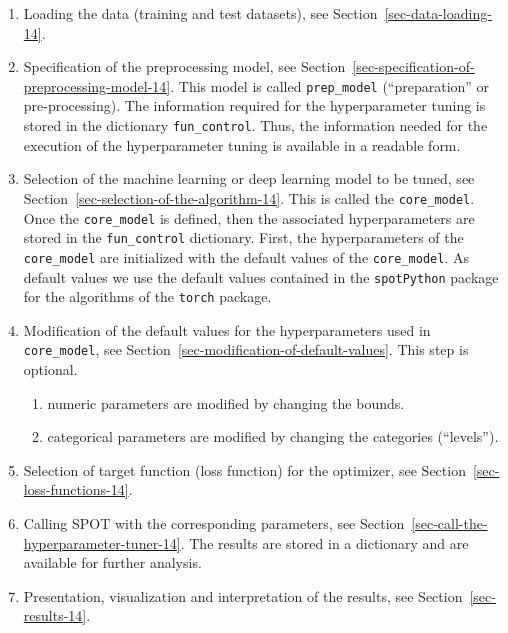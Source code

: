 \documentclass[
  letterpaper,
  DIV=11,
  numbers=noendperiod]{scrreprt}
\providecommand{\tightlist}{%
  \setlength{\itemsep}{0pt}\setlength{\parskip}{0pt}}\usepackage{longtable,booktabs,array}
\begin{document}
\begin{enumerate}
\def\labelenumi{\arabic{enumi}.}
\tightlist
\item
  Loading the data (training and test datasets), see
  Section~\ref{sec-data-loading-14}.
\item
  Specification of the preprocessing model, see
  Section~\ref{sec-specification-of-preprocessing-model-14}. This model
  is called \texttt{prep\_model} (``preparation'' or pre-processing).
  The information required for the hyperparameter tuning is stored in
  the dictionary \texttt{fun\_control}. Thus, the information needed for
  the execution of the hyperparameter tuning is available in a readable
  form.
\item
  Selection of the machine learning or deep learning model to be tuned,
  see Section~\ref{sec-selection-of-the-algorithm-14}. This is called
  the \texttt{core\_model}. Once the \texttt{core\_model} is defined,
  then the associated hyperparameters are stored in the
  \texttt{fun\_control} dictionary. First, the hyperparameters of the
  \texttt{core\_model} are initialized with the default values of the
  \texttt{core\_model}. As default values we use the default values
  contained in the \texttt{spotPython} package for the algorithms of the
  \texttt{torch} package.
\item
  Modification of the default values for the hyperparameters used in
  \texttt{core\_model}, see
  Section~\ref{sec-modification-of-default-values}. This step is
  optional.

  \begin{enumerate}
  \def\labelenumii{\arabic{enumii}.}
  \tightlist
  \item
    numeric parameters are modified by changing the bounds.
  \item
    categorical parameters are modified by changing the categories
    (``levels'').
  \end{enumerate}
\item
  Selection of target function (loss function) for the optimizer, see
  Section~\ref{sec-loss-functions-14}.
\item
  Calling SPOT with the corresponding parameters, see
  Section~\ref{sec-call-the-hyperparameter-tuner-14}. The results are
  stored in a dictionary and are available for further analysis.
\item
  Presentation, visualization and interpretation of the results, see
  Section~\ref{sec-results-14}.
\end{enumerate}
\end{document}
